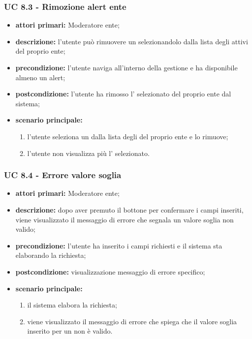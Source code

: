 			\subsubsection{UC 8.3 - Rimozione alert ente}
			\begin{itemize}
				\item \textbf{attori primari:} Moderatore ente;
				\item \textbf{descrizione:} l'utente può rimuovere un  selezionandolo dalla lista degli  attivi del proprio ente;
				\item \textbf{precondizione:} l'utente naviga all'interno della gestione  e ha disponibile almeno un alert;
				\item \textbf{postcondizione:} l'utente ha rimosso l' selezionato del proprio ente dal sistema;
				\item \textbf{scenario principale:}
				\begin{enumerate}
					\item{l'utente seleziona un  dalla lista degli  del proprio ente e lo rimuove;}
					\item{l'utente non visualizza più l' selezionato.}
				\end{enumerate}	
			\end{itemize}

			\subsubsection{UC 8.4 - Errore valore soglia}
			\begin{itemize}
				\item \textbf{attori primari:} Moderatore ente;
				\item \textbf{descrizione:} dopo aver premuto il bottone per confermare i campi inseriti, viene visualizzato il messaggio di errore che segnala un valore soglia non valido;
				\item \textbf{precondizione:} l'utente ha inserito i campi richiesti e il sistema sta elaborando la richiesta;
				\item \textbf{postcondizione:} visualizzazione messaggio di errore specifico;
				\item \textbf{scenario principale:}
				\begin{enumerate}
					\item{il sistema elabora la richiesta;}
					\item{viene visualizzato il messaggio di errore che spiega che il valore soglia inserito per un  non è valido.}
				\end{enumerate}
			\end{itemize}
			
